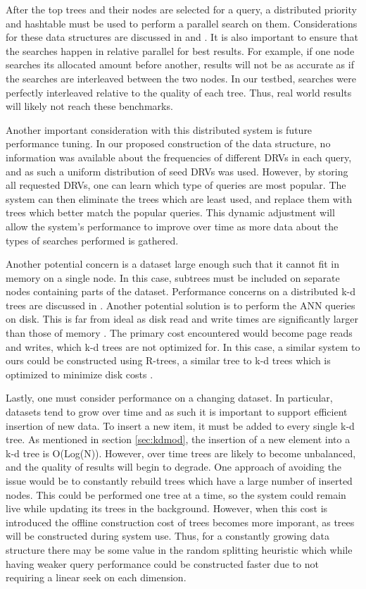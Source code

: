 After the top trees and their nodes are selected for a query, a distributed priority and hashtable must be used to perform a parallel search on them.  Considerations for these data structures are discussed in \citep{kaashoek2003koorde} and \citep{rogers1995supporting}.  It is also important to ensure that the searches happen in relative parallel for best results.  For example, if one node searches its allocated amount before another, results will not be as accurate as if the searches are interleaved between the two nodes.  In our testbed, searches were perfectly interleaved relative to the quality of each tree.  Thus, real world results will likely not reach these benchmarks.

Another important consideration with this distributed system is future performance tuning.  In our proposed construction of the data structure, no information was available about the frequencies of different DRVs in each query, and as such a uniform distribution of seed DRVs was used.  However, by storing all requested DRVs, one can learn which type of queries are most popular.  The system can then eliminate the trees which are least used, and replace them with trees which better match the popular queries.  This dynamic adjustment will allow the system's performance to improve over time as more data about the types of searches performed is gathered.

Another potential concern is a dataset large enough such that it cannot fit in memory on a single node.  In this case, subtrees must be included on separate nodes containing parts of the dataset.  Performance concerns on a distributed k-d trees are discussed in \citep{aly2011distributed}.  Another potential solution is to perform the ANN queries on disk.  This is far from ideal as disk read and write times are significantly larger than those of memory \citep{karedla1994caching}.  The primary cost encountered would become page reads and writes, which k-d trees are not optimized for.  In this case, a similar system to ours could be constructed using R-trees, a similar tree to k-d trees which is optimized to minimize disk costs \citep{guttman1984r}.

Lastly, one must consider performance on a changing dataset.  In particular, datasets tend to grow over time and as such it is important to support efficient insertion of new data.  To insert a new item, it must be added to every single k-d tree.  As mentioned in section \ref{sec:kdmod}, the insertion of a new element into a k-d tree is O(Log(N)).  However, over time trees are likely to become unbalanced, and the quality of results will begin to degrade.  One approach of avoiding the issue would be to constantly rebuild trees which have a large number of inserted nodes.  This could be performed one tree at a time, so the system could remain live while updating its trees in the background.  However, when this cost is introduced the offline construction cost of trees becomes more imporant, as trees will be constructed during system use.  Thus, for a constantly growing data structure there may be some value in the random splitting heuristic which while having weaker query performance could be constructed faster due to not requiring a linear seek on each dimension.

